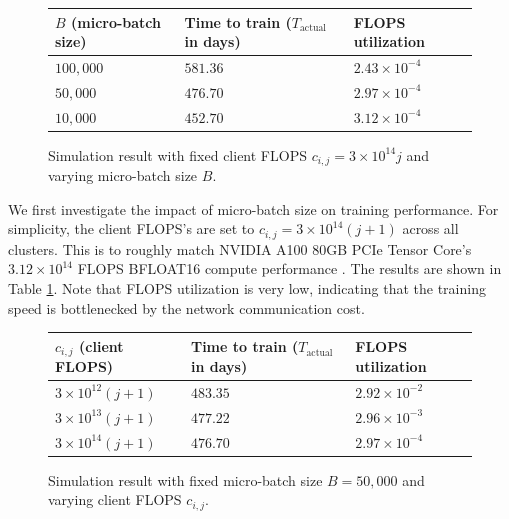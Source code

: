 \documentclass{article}
\begin{document}
\begin{figure}
    \centering
    \small
    \begin{tabular}{l|l|l}
        \hline
        \textbf{$B$ (micro-batch size)} & \textbf{Time to train ($T_{\text{actual}}$ in days)} & \textbf{FLOPS utilization} \\
        \hline
        $100,000$ & $581.36$ & $2.43 \times 10^{-4}$ \\
        \hline
        $50,000$ & $476.70$ & $2.97 \times 10^{-4}$ \\
        \hline
        $10,000$ & $452.70$ & $3.12 \times 10^{-4}$ \\
        \hline
    \end{tabular}
    \caption{Simulation result with fixed client FLOPS $c_{i, j} = 3 \times 10^{14} j$ and varying micro-batch size $B$.}
    \label{tab:simulation_micro_batch}
\end{figure}

We first investigate the impact of micro-batch size on training performance. For simplicity, the client FLOPS's are set to $c_{i, j} = 3 \times 10^{14} (j + 1)$ across all clusters. This is to roughly match NVIDIA A100 80GB PCIe Tensor Core's $3.12 \times 10^{14}$ FLOPS BFLOAT16 compute performance \cite{nvidia2020a100}. The results are shown in Table \ref{tab:simulation_micro_batch}. Note that FLOPS utilization is very low, indicating that the training speed is bottlenecked by the network communication cost.


\begin{figure}
    \centering
    \small
    \small
    \begin{tabular}{l|l|l}
        \hline
        \textbf{$c_{i, j}$ (client FLOPS)} & \textbf{Time to train ($T_{\text{actual}}$ in days)} & \textbf{FLOPS utilization} \\
        \hline
        $3 \times 10^{12} (j + 1)$ & $483.35$ & $2.92 \times 10^{-2}$ \\
        \hline
        $3 \times 10^{13} (j + 1)$ & $477.22$ & $2.96 \times 10^{-3}$ \\
        \hline
        $3 \times 10^{14} (j + 1)$ & $476.70$ & $2.97 \times 10^{-4}$ \\
        \hline
    \end{tabular}
    \caption{Simulation result with fixed micro-batch size $B=50,000$ and varying client FLOPS $c_{i, j}$.}
    \label{tab:simulation_flops}
\end{figure}
\end{document}
